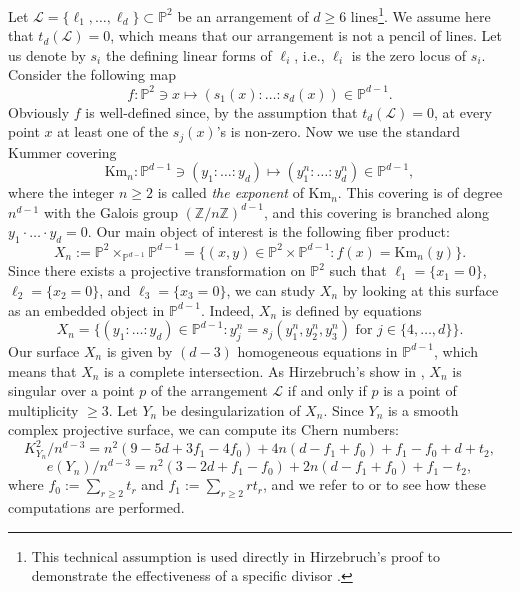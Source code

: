 \documentclass{article}
\theoremstyle{plain}
\theoremstyle{definition}
\numberwithin{equation}{section}
\begin{document}
Let $\mathcal{L} = \{\ell_{1}, \ldots, \ell_{d}\} \subset \mathbb{P}^{2}$ be an arrangement of $d\geq 6$ lines\footnote{This technical assumption is used directly in Hirzebruch's proof to demonstrate the effectiveness of a specific divisor \cite[p. 127]{Hirzebruch}.}. We assume here that $t_{d}(\mathcal{L}) = 0$, which means that our arrangement is not a pencil of lines. Let us denote by $s_{i}$ the defining linear forms of $\ell_{i}$, i.e., $\ell_{i}$ is the zero locus of $s_{i}$. Consider the following map 
\[f : \mathbb{P}^{2} \ni x \mapsto (s_{1}(x): \ldots : s_{d}(x)) \in \mathbb{P}^{d-1}.\]
Obviously $f$ is well-defined since, by the assumption that $t_{d}(\mathcal{L})=0$, at every point $x$ at least one of the $s_{j}(x)$'s is non-zero.
Now we use the standard Kummer covering
\[\textrm{Km}_{n}: \mathbb{P}^{d-1}\ni (y_{1}: \ldots :y_{d}) \mapsto (y_{1}^{n}: \ldots : y_{d}^{n}) \in \mathbb{P}^{d-1},\]
where the integer $n\geq 2$ is called \textit{the exponent} of $\textrm{Km}_{n}$. This covering is of degree $n^{d-1}$ with the Galois group $(\mathbb{Z}/n\mathbb{Z})^{d-1}$, and this covering is branched along $y_{1} \cdot \ldots \cdot y_{d} = 0$. Our main object of interest is the following fiber product:
\begin{equation}
\label{XN}
X_{n} := \mathbb{P}^{2} \times_{\mathbb{P}^{d-1}} \mathbb{P}^{d-1}= \{(x,y) \in \mathbb{P}^{2} \times \mathbb{P}^{d-1} : f(x) = \textrm{Km}_{n}(y)\}.
\end{equation}
Since there exists a projective transformation on $\mathbb{P}^{2}$ such that $\ell_{1} = \{x_{1}=0\}$, $\ell_{2} = \{x_{2} = 0\}$, and $\ell_{3} = \{x_{3} = 0 \}$, we can study $X_{n}$ by looking at this surface as an embedded object in $\mathbb{P}^{d-1}$. Indeed, $X_{n}$ is defined by equations
\[
X_{n} = \{ (y_{1}: \ldots :y_{d})\in \mathbb{P}^{d-1} : y_{j}^{n} = s_{j}(y_{1}^{n}, y_{2}^{n}, y_{3}^{n}) \,\, \textrm{for} \,\, j \in \{4, \ldots ,d\} \}.
\]
Our surface $X_{n}$ is given by $(d-3)$ homogeneous equations in $\mathbb{P}^{d-1}$, which means that $X_{n}$ is a complete intersection. As Hirzebruch's show in \cite{Hirzebruch}, $X_{n}$ is singular over a point $p$ of the arrangement $\mathcal{L}$ if and only if $p$ is a point of multiplicity $\geq 3$. Let $Y_{n}$ be desingularization of $X_{n}$. Since $Y_{n}$ is a smooth complex projective surface, we can compute its Chern numbers: 
\[K^{2}_{Y_{n}}/n^{d-3}= n^{2}(9-5d + 3f_{1} - 4f_{0}) + 4n(d-f_{1}+f_{0})+f_{1}-f_{0}+d+t_{2},\]
\[e(Y_{n})/n^{d-3} = n^{2}(3-2d+f_{1}-f_{0}) + 2n(d-f_{1}+f_{0}) + f_{1}-t_{2},\]
where $f_{0} := \sum_{r\geq 2} t_{r}$ and $f_{1}:=\sum_{r\geq 2} rt_{r}$, and we refer to \cite[pp. 123 -- 125]{Hirzebruch} or \cite[Chapter 24]{CCC} to see how these computations are performed. 
\end{document}
